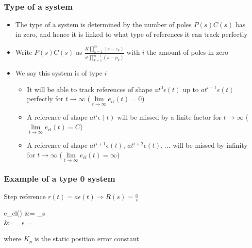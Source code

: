 \begin{frame}
	\frametitle{Type of a system}
	\begin{block}{}
		\begin{itemize}
			\item The type of a system is determined by the number of poles $P(s)C(s)$ has in zero, and hence it is linked to what type of references it can track perfectly
			\item Write $P(s)C(s)$ as $\frac{K \prod_{k=1}^{m} (s-z_k)}{s^i \prod_{k=1}^{n-i} (s-p_k)}$ with $i$ the amount of poles in zero
			\item We say this system is of type $i$
			\begin{itemize}
				\item It will be able to track references of shape $at^0 \epsilon(t)$ up to $at^{i - 1} \epsilon(t)$ perfectly for $t\rightarrow \infty$ ($\lim\limits_{t \rightarrow \infty} e_{cl}(t) = 0$)
				\item A reference of shape $at^i \epsilon(t)$ will be missed by a finite factor for $t\rightarrow \infty$ ($\lim\limits_{t \rightarrow \infty} e_{cl}(t) = C$)
				\item A reference of shape $at^{i+1} \epsilon(t)$, $at^{i+2} \epsilon(t)$, ... will be missed by infinity for $t\rightarrow \infty$ ($\lim\limits_{t \rightarrow \infty} e_{cl}(t) = \infty$)
			\end{itemize}
		\end{itemize}
	\end{block}
\end{frame}

\begin{frame}
	\frametitle{Example of a type 0 system}
		\begin{example}
			{Step reference $r(t) = a \epsilon (t) \Rightarrow R(s) = \frac{a}{s}$}
			\begin{flalign*}
				e_{cl}(\infty) &= \lim\limits_{s }   \\
				&= \lim\limits_{s } 
				= 
			\end{flalign*}
			where $K_p$ is the static position error constant
		\end{example}
\end{frame}

